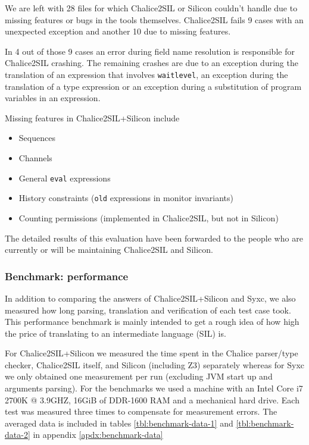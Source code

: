 We are left with 28 files for which Chalice2SIL or Silicon couldn't handle due to missing features or bugs in the tools themselves.
Chalice2SIL fails 9 cases with an unexpected exception and another 10 due to missing features.

In 4 out of those 9 cases an error during field name resolution is responsible for Chalice2SIL crashing. 
The remaining crashes are due to an exception during the translation of an expression that involves \lstinline[language=Chalice]!waitlevel!, an exception during the translation of a type expression or an exception during a substitution of program variables in an expression.

Missing features in Chalice2SIL+Silicon include
\begin{itemize}
\item Sequences
\item Channels
\item General \lstinline[language=Chalice]!eval! expressions
\item History constraints (\lstinline[language=Chalice]!old! expressions in monitor invariants)
\item Counting permissions (implemented in Chalice2SIL, but not in Silicon)
\end{itemize}

The detailed results of this evaluation have been forwarded to the people who are currently or will be maintaining Chalice2SIL and Silicon.

\subsubsection{Benchmark: performance}
In addition to comparing the answers of Chalice2SIL+Silicon and Syxc, we also measured how long parsing, translation and verification of each test case took.
This performance benchmark is mainly intended to get a rough idea of how high the price of translating to an intermediate language (SIL) is.

For Chalice2SIL+Silicon we measured the time spent in the Chalice parser/type checker, Chalice2SIL itself, and Silicon (including Z3) separately whereas for Syxc we only obtained one measurement per run (excluding JVM start up and arguments parsing).
For the benchmarks we used a machine with an Intel Core i7 2700K @ 3.9GHZ, 16GiB of DDR-1600 RAM and a mechanical hard drive.
Each test was measured three times to compensate for measurement errors.
The averaged data is included in tables \ref{tbl:benchmark-data-1} and \ref{tbl:benchmark-data-2} in appendix \ref{apdx:benchmark-data}

